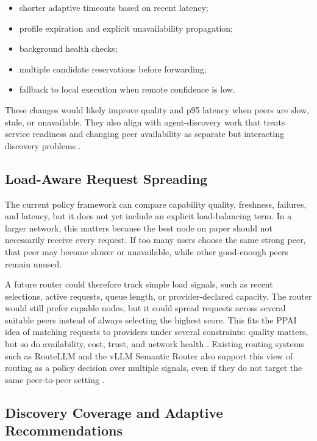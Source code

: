 \begin{itemize}
  \item shorter adaptive timeouts based on recent latency;
  \item profile expiration and explicit unavailability propagation;
  \item background health checks;
  \item multiple candidate reservations before forwarding;
  \item fallback to local execution when remote confidence is low.
\end{itemize}

These changes would likely improve quality and p95 latency when peers are
slow, stale, or unavailable. They also align with agent-discovery work that
treats service readiness and changing peer availability as separate but
interacting discovery problems
\citep{dazzi2026usableagentdiscovery,guo2026agentdiscovery}.

\subsection{Load-Aware Request Spreading}

The current policy framework can compare capability quality, freshness,
failures, and latency, but it does not yet include an explicit load-balancing
term. In a larger network, this matters because the best node on paper should
not necessarily receive every request. If too many users choose the same strong
peer, that peer may become slower or unavailable, while other good-enough peers
remain unused.

A future router could therefore track simple load signals, such as recent
selections, active requests, queue length, or provider-declared capacity. The
router would still prefer capable nodes, but it could spread requests across
several suitable peers instead of always selecting the highest score. This fits
the PPAI idea of matching requests to providers under several constraints:
quality matters, but so do availability, cost, trust, and network health
\citep{wang2026ppai}. Existing routing systems such as RouteLLM and the vLLM
Semantic Router also support this view of routing as a policy decision over
multiple signals, even if they do not target the same peer-to-peer setting
\citep{ong2025routellm,vllmsemanticrouter2026}.

\subsection{Discovery Coverage and Adaptive Recommendations}

